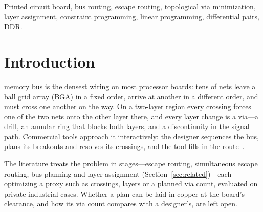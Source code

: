 \documentclass[journal]{IEEEtran}
\begin{document}
\begin{IEEEkeywords}
Printed circuit board, bus routing, escape routing, topological via minimization, layer assignment, constraint programming, linear programming, differential pairs, DDR.
\end{IEEEkeywords}

\section{Introduction}
 memory bus is the densest wiring on most processor boards: tens of nets leave a ball grid array (BGA) in a fixed order, arrive at another in a different order, and must cross one another on the way. On a two-layer region every crossing forces one of the two nets onto the other layer there, and every layer change is a via---a drill, an annular ring that blocks both layers, and a discontinuity in the signal path. Commercial tools approach it interactively: the designer sequences the bus, plans its breakouts and resolves its crossings, and the tool fills in the route~\cite{cadence2015,pfeil2014}.

The literature treats the problem in stages---escape routing, simultaneous escape routing, bus planning and layer assignment (Section~\ref{sec:related})---each optimizing a proxy such as crossings, layers or a planned via count, evaluated on private industrial cases. Whether a plan can be laid in copper at the board's clearance, and how its via count compares with a designer's, are left open.
\end{document}
